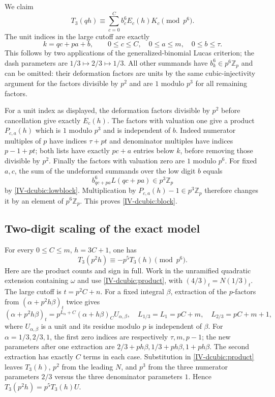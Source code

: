 \documentclass[11pt,letterpaper]{article}
\numberwithin{equation}{section}
\begin{document}
We claim
\begin{equation}\label{IV-dcubic:block}
 T_3(qh)\equiv\sum_{c=0}^{C}b_c^6E_c(h)K_c\pmod{p^6}.
\end{equation}
The unit indices in the large cutoff are exactly
\[
 k=qc+pa+b,\qquad0\le c\le C,\quad0\le a\le m,\quad0\le b\le\tau.
\]
This follows by two applications of the generalized-binomial Lucas
criterion; the dash parameters are $1/3\mapsto2/3\mapsto1/3$.
All other summands have $b_k^6\in p^6\mathbb Z_p$ and can be omitted:
their deformation factors are units by the same cubic-injectivity
argument for the factors divisible by $p^2$ and are $1$ modulo $p^3$
for all remaining factors.

For a unit index as displayed, the deformation factors divisible
by $p^2$ before cancellation give exactly $E_c(h)$. The factors
with valuation one give a product $P_{c,a}(h)$ which is $1$ modulo
$p^3$ and is independent of $b$. Indeed numerator multiples of
$p$ have indices $\tau+pt$ and denominator multiples have indices
$p-1+pt$; both lists have exactly $pc+a$ entries below $k$, before
removing those divisible by $p^2$. Finally the factors with
valuation zero are $1$ modulo $p^6$.
For fixed $a,c$, the sum of the undeformed summands over the low
digit $b$ equals
\[
 b_{qc+pa}^6L(qc+pa)\in p^3\mathbb Z_p
\]
by \eqref{IV-dcubic:lowblock}. Multiplication by
$P_{c,a}(h)-1\in p^3\mathbb Z_p$ therefore changes it by an element
of $p^6\mathbb Z_p$. This proves \eqref{IV-dcubic:block}.

\subsection{Two-digit scaling of the exact model}
For every $0\le C\le m$, $h=3C+1$, one has
\begin{equation}\label{IV-dcubic:scale}
 T_3(p^2h)\equiv-p^5T_3(h)\pmod{p^6}.
\end{equation}
Here are the product counts and sign in full. Work in the unramified
quadratic extension containing $\omega$ and use
\eqref{IV-dcubic:product}, with $(4/3)_t=N(1/3)_t$.
The large cutoff is $t=p^2C+n$. For a fixed integral $\beta$, extraction
of the $p$-factors from $(\alpha+p^2h\beta)_t$ twice gives
\[
 (\alpha+p^2h\beta)_t
 =p^{L_\alpha+C}(\alpha+h\beta)_C U_{\alpha,\beta},
 \quad L_{1/3}=L_1=pC+m,\quad L_{2/3}=pC+m+1,
\]
where $U_{\alpha,\beta}$ is a unit and its residue modulo $p$ is
independent of $\beta$. For $\alpha=1/3,2/3,1$, the first zero
indices are respectively $\tau,m,p-1$; the new parameters after
one extraction are $2/3+ph\beta,1/3+ph\beta,1+ph\beta$.
The second extraction has exactly $C$ terms in each case.
Substitution in \eqref{IV-dcubic:product} leaves $T_3(h)$, $p^2$ from
the leading $N$, and $p^3$ from the three numerator parameters
$2/3$ versus the three denominator parameters $1$. Hence
$T_3(p^2h)=p^5T_3(h)U$.
\end{document}
